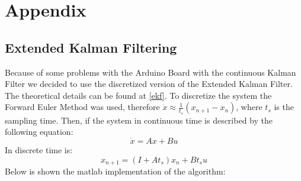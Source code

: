 \chapter*{Appendix}


\section{Extended Kalman Filtering}
Because of some problems with the Arduino Board with the continuous Kalman Filter we decided to use the discretized version of the Extended Kalman Filter. The theoretical details can be found at \ref{ekf}. To discretize the system the Forward Euler Method was used, therefore $\dot{x} \approx \frac{1}{t_s}(x_{n+1}-x_{n})$, where $t_s$ is the sampling time. Then, if the system in continuous time is described by the following equation:
\begin{equation}
\dot{x}=Ax+Bu
\end{equation}
In discrete time is:
\begin{equation}
x_{n+1}=(I+At_s)x_n + B t_s u
\end{equation}
Below is shown the matlab implementation of the algorithm:


